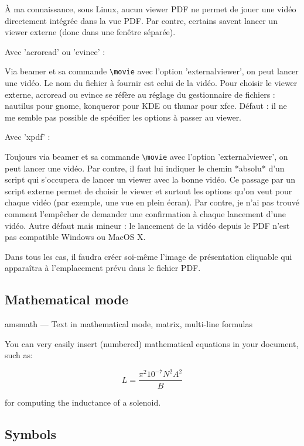 \documentclass{mcreport}
\begin{document}
À ma connaissance, sous Linux, aucun viewer PDF ne permet de jouer une vidéo
directement intégrée dans la vue PDF. Par contre, certains savent lancer un
viewer externe (donc dans une fenêtre séparée).

Avec 'acroread' ou 'evince' :

Via beamer et sa commande \verb|\movie| avec l'option 'externalviewer', on
peut lancer une vidéo. Le nom du fichier à fournir est celui de la vidéo.
Pour choisir le viewer externe, acroread ou evince se réfère au réglage du
gestionnaire de fichiers : nautilus pour gnome, konqueror pour KDE ou thunar
pour xfce. Défaut : il ne me semble pas possible de spécifier les options à
passer au viewer.

Avec 'xpdf' :

Toujours via beamer et sa commande \verb|\movie| avec l'option
'externalviewer', on peut lancer une vidéo. Par contre, il faut lui indiquer
le chemin *absolu* d'un script qui s'occupera de lancer un viewer avec la
bonne vidéo. Ce passage par un script externe permet de choisir le viewer et
surtout les options qu'on veut pour chaque vidéo (par exemple, une vue en
plein écran). Par contre, je n'ai pas trouvé comment l'empêcher de demander
une confirmation à chaque lancement d'une vidéo. Autre défaut mais mineur :
le lancement de la vidéo depuis le PDF n'est pas compatible Windows ou MacOS
X.

Dans tous les cas, il faudra créer soi-même l'image de présentation
cliquable qui apparaîtra à l'emplacement prévu dans le fichier PDF.


\subsection{Mathematical mode}
\label{sec:mathematical-mode}

amsmath --- Text in mathematical mode, matrix, multi-line formulas

You can very easily insert (numbered) mathematical equations in your
document, such as:

\begin{equation}
    \label{eq:1}
    L = \frac{\pi^2 10^{-7} N^2 A^2}{B}
\end{equation}

for computing the inductance of a solenoid.

\subsection{Symbols}
\label{sec:symbols}
\end{document}
